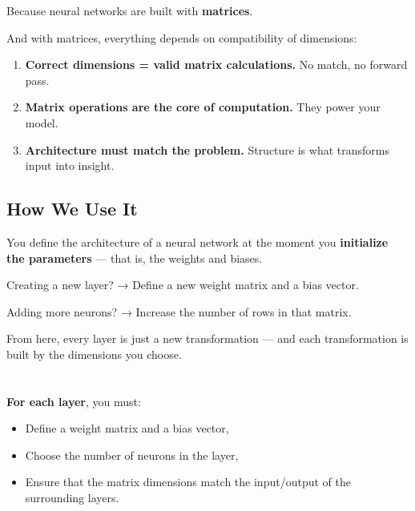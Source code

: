 \documentclass[11pt]{article}
\begin{document}
Because neural networks are built with \textbf{matrices}.

And with matrices, everything depends on compatibility of dimensions:
\begin{enumerate}
    \item \textbf{Correct dimensions = valid matrix calculations.}  
    No match, no forward pass.
    \item \textbf{Matrix operations are the core of computation.}  
    They power your model.
    \item \textbf{Architecture must match the problem.}  
    Structure is what transforms input into insight.
\end{enumerate}

\vspace{1em}

\subsection*{How We Use It}

You define the architecture of a neural network at the moment you \textbf{initialize the parameters} —  
that is, the weights and biases.

\begin{tcolorbox}[colback=blue!5!white, colframe=blue!80!black, title=Core Principle]
Creating a new layer?  
→ Define a new weight matrix and a bias vector.

Adding more neurons?  
→ Increase the number of rows in that matrix.
\end{tcolorbox}

From here, every layer is just a new transformation —  
and each transformation is built by the dimensions you choose.

\section*{}

\vspace{0.5em}

\textbf{For each layer}, you must:

\begin{itemize}
  \item Define a weight matrix and a bias vector,
  \item Choose the number of neurons in the layer,
  \item Ensure that the matrix dimensions match the input/output of the surrounding layers.
\end{itemize}
\end{document}
